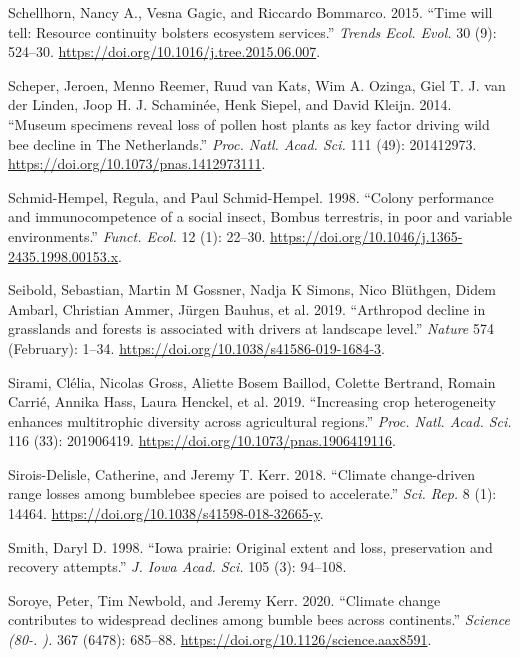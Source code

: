 \documentclass[11pt,]{article}
\begin{document}
\leavevmode\hypertarget{ref-Schellhorn2015c}{}%
Schellhorn, Nancy A., Vesna Gagic, and Riccardo Bommarco. 2015. ``Time
will tell: Resource continuity bolsters ecosystem services.''
\emph{Trends Ecol. Evol.} 30 (9): 524--30.
\url{https://doi.org/10.1016/j.tree.2015.06.007}.

\leavevmode\hypertarget{ref-Scheper2014}{}%
Scheper, Jeroen, Menno Reemer, Ruud van Kats, Wim A. Ozinga, Giel T. J.
van der Linden, Joop H. J. Schaminée, Henk Siepel, and David Kleijn.
2014. ``Museum specimens reveal loss of pollen host plants as key factor
driving wild bee decline in The Netherlands.'' \emph{Proc. Natl. Acad.
Sci.} 111 (49): 201412973.
\url{https://doi.org/10.1073/pnas.1412973111}.

\leavevmode\hypertarget{ref-Schmid-Hempel1998a}{}%
Schmid-Hempel, Regula, and Paul Schmid-Hempel. 1998. ``Colony
performance and immunocompetence of a social insect, Bombus terrestris,
in poor and variable environments.'' \emph{Funct. Ecol.} 12 (1): 22--30.
\url{https://doi.org/10.1046/j.1365-2435.1998.00153.x}.

\leavevmode\hypertarget{ref-Seibold2019}{}%
Seibold, Sebastian, Martin M Gossner, Nadja K Simons, Nico Blüthgen,
Didem Ambarl, Christian Ammer, Jürgen Bauhus, et al. 2019. ``Arthropod
decline in grasslands and forests is associated with drivers at
landscape level.'' \emph{Nature} 574 (February): 1--34.
\url{https://doi.org/10.1038/s41586-019-1684-3}.

\leavevmode\hypertarget{ref-Sirami2019}{}%
Sirami, Clélia, Nicolas Gross, Aliette Bosem Baillod, Colette Bertrand,
Romain Carrié, Annika Hass, Laura Henckel, et al. 2019. ``Increasing
crop heterogeneity enhances multitrophic diversity across agricultural
regions.'' \emph{Proc. Natl. Acad. Sci.} 116 (33): 201906419.
\url{https://doi.org/10.1073/pnas.1906419116}.

\leavevmode\hypertarget{ref-Sirois-Delisle2018}{}%
Sirois-Delisle, Catherine, and Jeremy T. Kerr. 2018. ``Climate
change-driven range losses among bumblebee species are poised to
accelerate.'' \emph{Sci. Rep.} 8 (1): 14464.
\url{https://doi.org/10.1038/s41598-018-32665-y}.

\leavevmode\hypertarget{ref-Smith1998}{}%
Smith, Daryl D. 1998. ``Iowa prairie: Original extent and loss,
preservation and recovery attempts.'' \emph{J. Iowa Acad. Sci.} 105 (3):
94--108.

\leavevmode\hypertarget{ref-Soroye2020}{}%
Soroye, Peter, Tim Newbold, and Jeremy Kerr. 2020. ``Climate change
contributes to widespread declines among bumble bees across
continents.'' \emph{Science (80-. ).} 367 (6478): 685--88.
\url{https://doi.org/10.1126/science.aax8591}.
\end{document}
